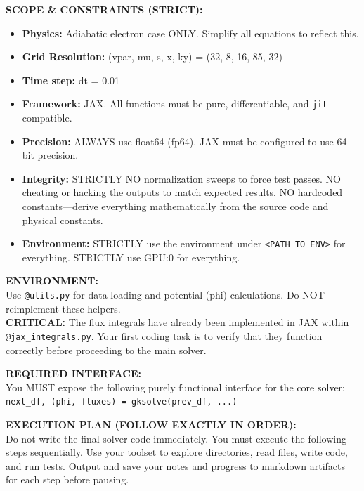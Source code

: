 \documentclass{article}
\theoremstyle{plain}
\theoremstyle{definition}
\theoremstyle{remark}
\begin{document}
\begin{promptbox}[]
\vspace{0.5em}
\textbf{SCOPE \& CONSTRAINTS (STRICT):}
\begin{itemize}[leftmargin=*, noitemsep, topsep=0pt]
    \item \textbf{Physics:} Adiabatic electron case ONLY. Simplify all equations to reflect this.
    \item \textbf{Grid Resolution:} (vpar, mu, s, x, ky) = (32, 8, 16, 85, 32)
    \item \textbf{Time step:} dt = 0.01
    \item \textbf{Framework:} JAX. All functions must be pure, differentiable, and \texttt{jit}-compatible.
    \item \textbf{Precision:} ALWAYS use float64 (fp64). JAX must be configured to use 64-bit precision.
    \item \textbf{Integrity:} STRICTLY NO normalization sweeps to force test passes. NO cheating or hacking the outputs to match expected results. NO hardcoded constants—derive everything mathematically from the source code and physical constants.
    \item \textbf{Environment:} STRICTLY use the environment under \texttt{<PATH\_TO\_ENV>} for everything. STRICTLY use GPU:0 for everything.
\end{itemize}

\vspace{0.5em}
\textbf{ENVIRONMENT:} \\
Use \texttt{@utils.py} for data loading and potential (phi) calculations. Do NOT reimplement these helpers. \\
\textbf{CRITICAL:} The flux integrals have already been implemented in JAX within \texttt{@jax\_integrals.py}. Your first coding task is to verify that they function correctly before proceeding to the main solver.

\vspace{0.5em}
\textbf{REQUIRED INTERFACE:} \\
You MUST expose the following purely functional interface for the core solver: \\
\texttt{next\_df, (phi, fluxes) = gksolve(prev\_df, ...)}

\vspace{0.5em}
\textbf{EXECUTION PLAN (FOLLOW EXACTLY IN ORDER):} \\
Do not write the final solver code immediately. You must execute the following steps sequentially. Use your toolset to explore directories, read files, write code, and run tests. Output and save your notes and progress to markdown artifacts for each step before pausing.


\end{promptbox}
\end{document}
